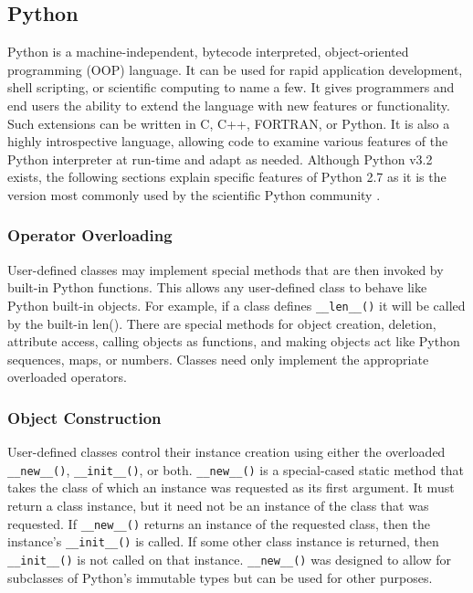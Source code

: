 \documentclass{sigplanconf}
\begin{document}
\subsection{Python}

Python \cite{Lun01,Pyt11a} is a machine-independent, bytecode interpreted,
object-oriented programming (OOP) language. It can be used for rapid
application development, shell scripting, or scientific computing to name a
few. It gives programmers and end users the ability to extend the language
with new features or functionality. Such extensions can be written in C, C++,
FORTRAN, or Python. It is also a highly introspective language, allowing code
to examine various features of the Python interpreter at run-time and adapt as
needed. Although Python v3.2 exists, the following sections explain specific
features of Python 2.7 as it is the version most commonly used by the
scientific Python community \cite{Pyt11b}.

\subsubsection{Operator Overloading}

User-defined classes may implement special methods that are then invoked by
built-in Python functions. This allows any user-defined class to behave like
Python built-in objects. For example, if a class defines \verb=__len__()= it
will be called by the built-in len(). There are special methods for object
creation, deletion, attribute access, calling objects as functions, and making
objects act like Python sequences, maps, or numbers. Classes need only
implement the appropriate overloaded operators.

\subsubsection{Object Construction}

User-defined classes control their instance creation using either the
overloaded \verb=__new__()=, \verb=__init__()=, or both. \verb=__new__()= is a
special-cased static method that takes the class of which an instance was
requested as its first argument. It must return a class instance, but it need
not be an instance of the class that was requested. If \verb=__new__()=
returns an instance of the requested class, then the instance’s
\verb=__init__()= is called. If some other class instance is returned, then
\verb=__init__()= is not called on that instance.  \verb=__new__()= was
designed to allow for subclasses of Python’s immutable types but can be used
for other purposes.
\end{document}
